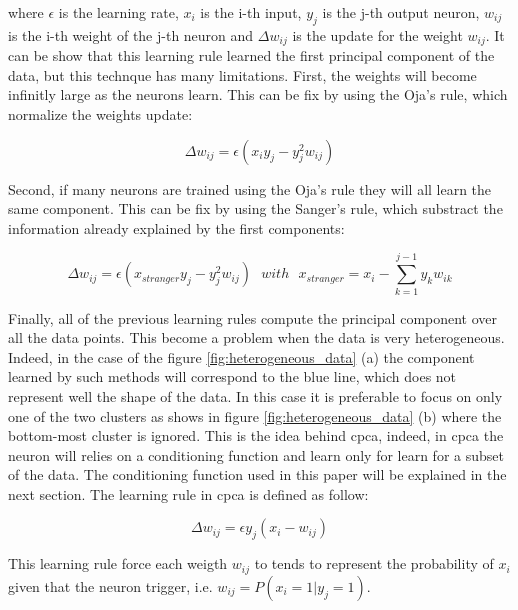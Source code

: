 \documentclass[11pt]{report}
\begin{document}
\noindent where $\epsilon$ is the learning rate, $x_i$ is the i-th input, $y_j$ is the j-th output neuron, $w_{ij}$ is the i-th weight of the j-th neuron and $\Delta w_{ij}$ is the update for the weight $w_{ij}$. It can be show that this learning rule learned the first principal component of the data, but this technque has many limitations. First, the weights will become infinitly large as the neurons learn. This can be fix by using the Oja's rule, which normalize the weights update:

\begin{equation}
\Delta w_{ij} = \epsilon (x_iy_j - y_j^2w_{ij})
\end{equation}

\noindent Second, if many neurons are trained using the Oja's rule they will all learn the same component. This can be fix by using the Sanger's rule, which substract the information already explained by the first components:

\begin{equation}
\Delta w_{ij} = \epsilon (x_{stranger}y_j - y_j^2w_{ij})\ \ \ with\ \ \ x_{stranger} = x_i - \sum_{k = 1}^{j - 1}{y_kw_{ik}}
\end{equation}

\noindent Finally, all of the previous learning rules compute the principal component over all the data points. This become a problem when the data is very heterogeneous. Indeed, in the case of the figure \ref{fig:heterogeneous_data} (a) the component learned by such methods will correspond to the blue line, which does not represent well the shape of the data. In this case it is preferable to focus on only one of the two clusters as shows in figure \ref{fig:heterogeneous_data} (b) where the bottom-most cluster is ignored. This is the idea behind \acrshort{cpca}, indeed, in \acrshort{cpca} the neuron will relies on a conditioning function and learn only for learn for a subset of the data. The conditioning function used in this paper will be explained in the next section. The learning rule in \acrshort{cpca} is defined as follow:

\begin{equation}
\Delta w_{ij} = \epsilon y_j (x_i - w_{ij})
\end{equation}

\noindent This learning rule force each weigth $w_{ij}$ to tends to represent the probability of $x_i$ given that the neuron trigger, i.e. $w_{ij} = P(x_i = 1 | y_j = 1)$.
\end{document}
